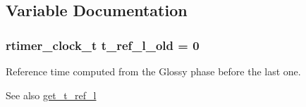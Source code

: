 \subsection{Variable Documentation}
\hypertarget{group__glossy-test-variables-sched-sync_ga46f9e2e4e895cd040435c428e7915b22}{
\subsubsection[{t\_\-ref\_\-l\_\-old}]{\setlength{\rightskip}{0pt plus 5cm}rtimer\_\-clock\_\-t {\bf t\_\-ref\_\-l\_\-old} = 0}}
\label{group__glossy-test-variables-sched-sync_ga46f9e2e4e895cd040435c428e7915b22}


Reference time computed from the Glossy phase before the last one. 

\begin{DoxySeeAlso}{See also}
\hyperlink{group__glossy__sync_gaa37a5474c90f7747d0f5054dc1a03764}{get\_\-t\_\-ref\_\-l} 
\end{DoxySeeAlso}
